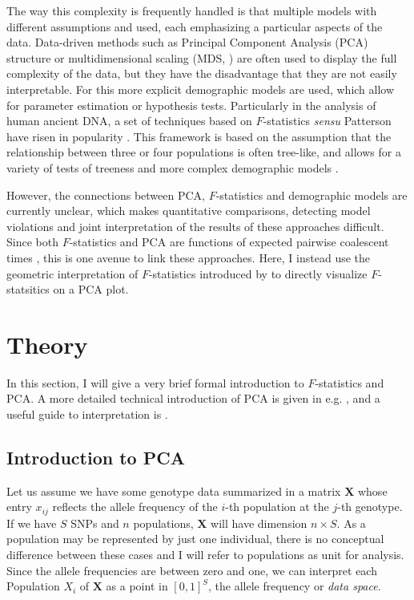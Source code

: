 \documentclass[12pt,a4pape, fullpage]{article}
\newcommand{\MX}{\mathbf{X}} %
\begin{document}
The way this complexity is frequently handled is that multiple models with different assumptions and used, each emphasizing a particular aspects of the data. Data-driven methods such as Principal Component Analysis (PCA) \citep{cavalli-sforza1994} structure \citep{pritchard2000} or multidimensional scaling (MDS, \cite{malaspinas2014}) are often used to display the full complexity of the data, but they have the disadvantage that they are not easily interpretable. For this more explicit demographic models \citep{gutenkunst2009, kamm2015, excoffier2013} are used, which allow for parameter estimation or hypothesis tests. Particularly in the analysis of human ancient DNA, a set of techniques based on $F$-statistics \textit{sensu} Patterson have risen in popularity \citep{patterson2012, peter2016}. This framework is based on the assumption that the relationship between three or four populations is often tree-like, and allows for a variety of tests of treeness and more complex demographic models \citep{patterson2012, harney2021}. 

However, the connections between PCA, $F$-statistics and demographic models are currently unclear, which makes quantitative comparisons, detecting model violations and joint interpretation of the results of these approaches difficult. Since both $F$-statistics and PCA are functions of expected pairwise coalescent times \citep{mcvean2009, peter2016}, this is one avenue to link these approaches. Here, I instead use the geometric interpretation of $F$-statistics introduced by  \cite{oteo-garcia2021} to directly visualize $F$-statsitics on a PCA plot. 


	
\section{Theory}
In this section, I will give a very brief formal introduction to $F$-statistics and PCA. A more detailed technical introduction of PCA is given in e.g. \cite{jolliffe2013}, and a useful guide to interpretation is \cite{cavalli-sforza1994}.

\subsection{Introduction to PCA}
Let us assume we have some genotype data summarized in a matrix $\MX$ whose entry $x_{ij}$ reflects the allele frequency of the $i$-th population at the $j$-th genotype. If we have $S$ SNPs and $n$ populations, $\MX$ will have dimension $n \times S$. As a population may be represented by just one individual, there is no conceptual difference between these cases and I will
refer to populations as unit for analysis. Since the allele
frequencies are between zero and one, we can interpret each Population $X_i$
of $\MX$ as a point in $[0, 1]^S$, the allele frequency or \emph{data space}.
	
\end{document}
